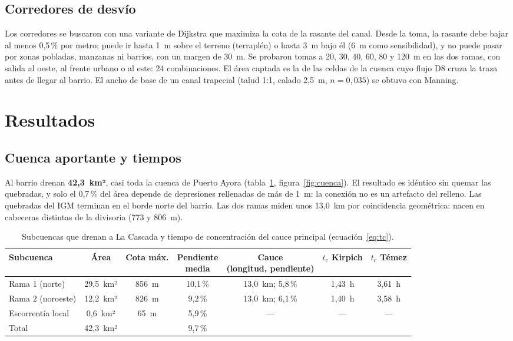 \documentclass{sosg-informe}
\begin{document}
\subsection{Corredores de desvío}
Los corredores se buscaron con una variante de Dijkstra que maximiza la cota de la rasante del canal. Desde la toma, la rasante debe bajar al menos 0,5\,\% por metro; puede ir hasta 1~m sobre el terreno (terraplén) o hasta 3~m bajo él (6~m como sensibilidad), y no puede pasar por zonas pobladas, manzanas ni barrios, con un margen de 30~m. Se probaron tomas a 20, 30, 40, 60, 80 y 120~m en las dos ramas, con salida al oeste, al frente urbano o al este: 24 combinaciones. El área captada es la de las celdas de la cuenca cuyo flujo D8 cruza la traza antes de llegar al barrio. El ancho de base de un canal trapecial (talud 1:1, calado 2,5~m, $n = 0,035$) se obtuvo con Manning.

\section{Resultados}

\subsection{Cuenca aportante y tiempos}
Al barrio drenan \textbf{42,3~km²}, casi toda la cuenca de Puerto Ayora (tabla~\ref{tab:cuenca}, figura~\ref{fig:cuenca}). El resultado es idéntico sin quemar las quebradas, y solo el 0,7\,\% del área depende de depresiones rellenadas de más de 1~m: la conexión no es un artefacto del relleno. Las quebradas del IGM terminan en el borde norte del barrio. Las dos ramas miden unos 13,0~km por coincidencia geométrica: nacen en cabeceras distintas de la divisoria (773 y 806~m).

\begin{table}[ht]
  \centering\small
  \caption{Subcuencas que drenan a La Cascada y tiempo de concentración del cauce principal (ecuación~\ref{eq:tc}).}
  \label{tab:cuenca}
  \begin{tabular}{lcccccc}
    \toprule
    Subcuenca & Área & Cota máx. & \makecell{Pendiente\\media} & \makecell{Cauce\\(longitud, pendiente)} & \makecell{$t_c$\\Kirpich} & \makecell{$t_c$\\Témez} \\
    \midrule
    Rama 1 (norte) & 29,5~km² & 856~m & 10,1\,\% & 13,0~km; 5,8\,\% & 1,43~h & 3,61~h \\
    Rama 2 (noroeste) & 12,2~km² & 826~m & 9,2\,\% & 13,0~km; 6,1\,\% & 1,40~h & 3,58~h \\
    Escorrentía local & 0,6~km² & 65~m & 5,9\,\% & --- & --- & --- \\
    \midrule
    Total & 42,3~km² & & 9,7\,\% & & & \\
    \bottomrule
  \end{tabular}
\end{table}
\end{document}
